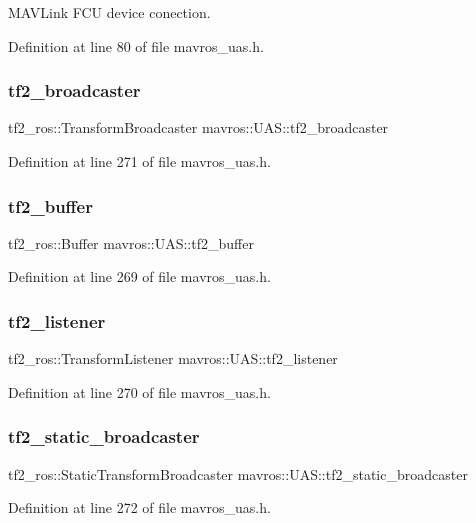 M\+A\+V\+Link F\+CU device conection. 



Definition at line 80 of file mavros\+\_\+uas.\+h.

\mbox{\label{group__nodelib_gaea0896a0daef68618142861b79395156}} 
\subsubsection{\texorpdfstring{tf2\_broadcaster}{tf2\_broadcaster}}
{\footnotesize\ttfamily tf2\+\_\+ros\+::\+Transform\+Broadcaster mavros\+::\+U\+A\+S\+::tf2\+\_\+broadcaster}



Definition at line 271 of file mavros\+\_\+uas.\+h.

\mbox{\label{group__nodelib_ga9c221ed548579fd2008fd1ac4d2b13e3}} 
\subsubsection{\texorpdfstring{tf2\_buffer}{tf2\_buffer}}
{\footnotesize\ttfamily tf2\+\_\+ros\+::\+Buffer mavros\+::\+U\+A\+S\+::tf2\+\_\+buffer}



Definition at line 269 of file mavros\+\_\+uas.\+h.

\mbox{\label{group__nodelib_gaa3606f3a1043f5a4666d2d922cbb170a}} 
\subsubsection{\texorpdfstring{tf2\_listener}{tf2\_listener}}
{\footnotesize\ttfamily tf2\+\_\+ros\+::\+Transform\+Listener mavros\+::\+U\+A\+S\+::tf2\+\_\+listener}



Definition at line 270 of file mavros\+\_\+uas.\+h.

\mbox{\label{group__nodelib_gad3a9ec1f5de439f1c43ade0b851bae38}} 
\subsubsection{\texorpdfstring{tf2\_static\_broadcaster}{tf2\_static\_broadcaster}}
{\footnotesize\ttfamily tf2\+\_\+ros\+::\+Static\+Transform\+Broadcaster mavros\+::\+U\+A\+S\+::tf2\+\_\+static\+\_\+broadcaster}



Definition at line 272 of file mavros\+\_\+uas.\+h.


